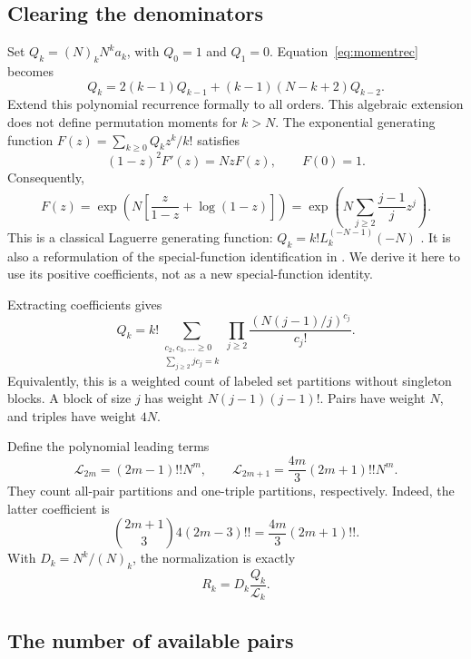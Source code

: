 \subsection{Clearing the denominators}

Set $Q_k=(N)_kN^ka_k$, with $Q_0=1$ and $Q_1=0$. Equation~\eqref{eq:momentrec} becomes
\begin{equation}\label{eq:qrec}
Q_k=2(k-1)Q_{k-1}+(k-1)(N-k+2)Q_{k-2}.
\end{equation}
Extend this polynomial recurrence formally to all orders. This algebraic extension does not define permutation moments for $k>N$. The exponential generating function $F(z)=\sum_{k\ge0}Q_kz^k/k!$ satisfies
\[
(1-z)^2F'(z)=NzF(z),\qquad F(0)=1.
\]
Consequently,
\begin{equation}\label{eq:egf}
F(z)=\exp\left(N\left[\frac z{1-z}+\log(1-z)\right]\right)
=\exp\left(N\sum_{j\ge2}\frac{j-1}{j}z^j\right).
\end{equation}
This is a classical Laguerre generating function: $Q_k=k!L_k^{(-N-1)}(-N)$ \cite[equations 18.5.12 and 18.12.13]{DLMF}. It is also a reformulation of the special-function identification in \cite[Remark 3.5]{CN}. We derive it here to use its positive coefficients, not as a new special-function identity.

Extracting coefficients gives
\begin{equation}\label{eq:partitions}
Q_k=k!\sum_{\substack{c_2,c_3,\ldots\ge0\\\sum_{j\ge2}jc_j=k}}
\prod_{j\ge2}\frac{(N(j-1)/j)^{c_j}}{c_j!}.
\end{equation}
Equivalently, this is a weighted count of labeled set partitions without singleton blocks. A block of size $j$ has weight $N(j-1)(j-1)!$. Pairs have weight $N$, and triples have weight $4N$.

Define the polynomial leading terms
\[
\mathcal L_{2m}=(2m-1)!!N^m,\qquad
\mathcal L_{2m+1}=\frac{4m}{3}(2m+1)!!N^m.
\]
They count all-pair partitions and one-triple partitions, respectively. Indeed, the latter coefficient is
\[
\binom{2m+1}{3}4(2m-3)!!=\frac{4m}{3}(2m+1)!!.
\]
With $D_k=N^k/(N)_k$, the normalization is exactly
\begin{equation}\label{eq:qnormalize}
R_k=D_k\frac{Q_k}{\mathcal L_k}.
\end{equation}

\subsection{The number of available pairs}

